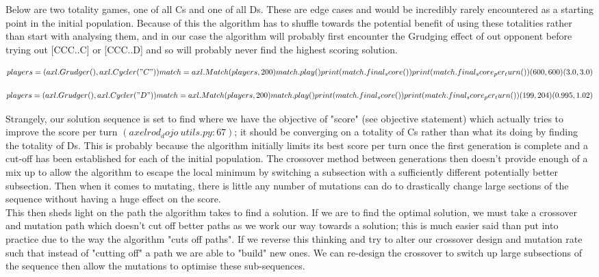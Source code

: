 Below are two totality games, one of all Cs and one of all Ds. These are edge cases and would be incredibly rarely encountered as a starting point in the initial population. Because of this the algorithm has to shuffle towards the potential benefit of using these totalities rather than start with analysing them, and in our case the algorithm will probably first encounter the Grudging effect of out opponent before trying out [CCC..C] or [CCC..D] and so will probably never find the highest scoring solution.

\[players = (axl.Grudger(),axl.Cycler("C"))
            match = axl.Match(players,200)
            match.play()
            print(match.final_score())
            print(match.final_score_per_turn())
            (600,600)
            (3.0,3.0)\]

            \[players = (axl.Grudger(),axl.Cycler("D"))
            match = axl.Match(players,200)
            match.play()
            print(match.final_score())
            print(match.final_score_per_turn())
            (199,204)
            (0.995,1.02)\]

Strangely, our solution sequence is set to find where we have the objective of "score" (see objective statement) which actually tries to improve the score per turn $(axelrod_dojo\ utils.py:67)$; it should be converging on a totality of Cs rather than what its doing by finding the totality of Ds. This is probably because the algorithm initially limits its best score per turn once the first generation is complete and a cut-off has been established for each of the initial population. The crossover method between generations then doesn't provide enough of a mix up to allow the algorithm to escape the local minimum by switching a subsection with a sufficiently different potentially better subsection. Then when it comes to mutating, there is little any number of mutations can do to drastically change large sections of the sequence without having a huge effect on the score.\\ 

This then sheds light on the path the algorithm takes to find a solution. If we are to find the optimal solution, we must take a crossover and mutation path which doesn't cut off better paths as we work our way towards a solution; this is much easier said than put into practice due to the way the algorithm "cuts off paths".
If we reverse this thinking and try to alter our crossover design and mutation rate such that instead of "cutting off" a path we are able to "build" new ones. We can re-design the crossover to switch up large subsections of the sequence then allow the mutations to optimise these sub-sequences.\\

